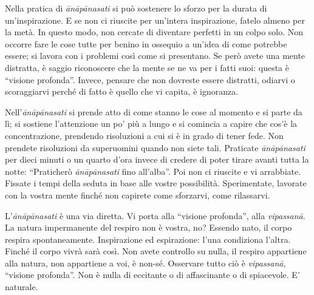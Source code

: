 Nella pratica di \textit{ānāpānasati} si può sostenere lo sforzo per la durata di
un'inspirazione. E se non ci riuscite per un'intera inspirazione, fatelo
almeno per la metà. In questo modo, non cercate di diventare perfetti in
un colpo solo. Non occorre fare le cose tutte per benino in ossequio a
un'idea di come potrebbe essere; si lavora con i problemi così come si
presentano. Se però avete una mente distratta, è saggio riconoscere che
la mente se ne va per i fatti suoi: questa è ``visione profonda''. Invece,
pensare che non dovreste essere distratti, odiarvi o scoraggiarvi perché
di fatto è quello che vi capita, è ignoranza.

Nell'\textit{ānāpānasati} si prende atto di come stanno le cose al momento e si
parte da lì; si sostiene l'attenzione un po' più a lungo e si comincia a
capire che cos'è la concentrazione, prendendo risoluzioni a cui si è in
grado di tener fede. Non prendete risoluzioni da superuomini quando non
siete tali. Praticate \textit{ānāpānasati} per dieci minuti o un quarto d'ora
invece di credere di poter tirare avanti tutta la notte: ``Praticherò
\textit{ānāpānasati} fino all'alba''. Poi non ci riuscite e vi arrabbiate. Fissate
i tempi della seduta in base alle vostre possibilità. Sperimentate,
lavorate con la vostra mente finché non capirete come sforzarvi, come
rilassarvi.

L'\textit{ānāpānasati} è una via diretta. Vi porta alla ``visione profonda'', alla
\textit{vipassanā}. La natura impermanente del respiro non è vostra, no? Essendo
nato, il corpo respira spontaneamente. Inspirazione ed espirazione:
l'una condiziona l'altra. Finché il corpo vivrà sarà così. Non avete
controllo su nulla, il respiro appartiene alla natura, non appartiene a
voi, è non-sé. Osservare tutto ciò è \textit{vipassanā}, ``visione profonda''. Non
è nulla di eccitante o di affascinante o di spiacevole. E' naturale.

